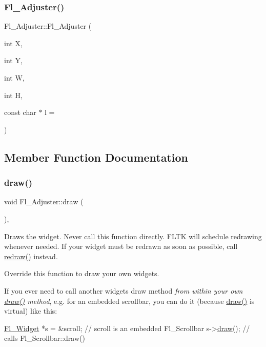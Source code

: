 \subsubsection{\texorpdfstring{Fl\+\_\+\+Adjuster()}{Fl\_Adjuster()}}
{\footnotesize\ttfamily Fl\+\_\+\+Adjuster\+::\+Fl\+\_\+\+Adjuster (\begin{DoxyParamCaption}\item[{int}]{X,  }\item[{int}]{Y,  }\item[{int}]{W,  }\item[{int}]{H,  }\item[{const char $\ast$}]{l = {} }\end{DoxyParamCaption})}



\subsection{Member Function Documentation}
\mbox{\label{class_fl___adjuster_a6f34251b607ad461c8a03ab966ef5b21}} 
\subsubsection{\texorpdfstring{draw()}{draw()}}
{\footnotesize\ttfamily void Fl\+\_\+\+Adjuster\+::draw (\begin{DoxyParamCaption}{ }\end{DoxyParamCaption})\hspace{0.3cm}{\ttfamily [protected]}, {\ttfamily [virtual]}}

Draws the widget. Never call this function directly. F\+L\+TK will schedule redrawing whenever needed. If your widget must be redrawn as soon as possible, call \hyperlink{class_fl___widget_aa63ce68cbf4620cf8750b868368ea02b}{redraw()} instead.

Override this function to draw your own widgets.

If you ever need to call another widget\textquotesingle{}s draw method {\itshape from within your own \hyperlink{class_fl___adjuster_a6f34251b607ad461c8a03ab966ef5b21}{draw()} method}, e.\+g. for an embedded scrollbar, you can do it (because \hyperlink{class_fl___adjuster_a6f34251b607ad461c8a03ab966ef5b21}{draw()} is virtual) like this\+:


\begin{DoxyCode}
    \hyperlink{class_fl___widget}{Fl\_Widget} *s = &scroll;     \textcolor{comment}{// scroll is an embedded Fl\_Scrollbar}
s->\hyperlink{class_fl___widget_a1acb38c6b3cb40452ad02ccfeedbac8a}{draw}();          \textcolor{comment}{// calls Fl\_Scrollbar::draw()}
\end{DoxyCode}
 

